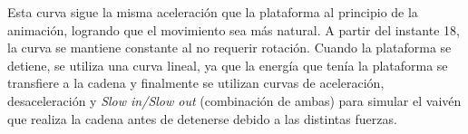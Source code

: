 \documentclass{article}
\begin{document}
\bigskip

Esta curva sigue la misma aceleración que la plataforma al principio de la animación, logrando que el movimiento sea más natural. A partir del instante 18, la curva se mantiene constante al no requerir rotación. Cuando la plataforma se detiene, se utiliza una curva lineal, ya que la energía que tenía la plataforma se transfiere a la cadena y finalmente se utilizan curvas de aceleración, desaceleración y \textit{Slow in/Slow out} (combinación de ambas) para simular el vaivén que realiza la cadena antes de detenerse debido a las distintas fuerzas.
\end{document}
